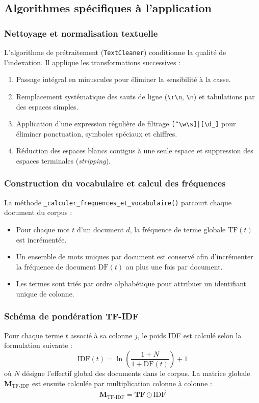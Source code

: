 \documentclass[12pt,a4paper]{article}
\begin{document}
\newpage

\subsection{Algorithmes spécifiques à l'application}

\subsubsection{Nettoyage et normalisation textuelle}
L'algorithme de prétraitement (\texttt{TextCleaner}) conditionne la qualité de l'indexation. Il applique les transformations successives :
\begin{enumerate}
    \item Passage intégral en minuscules pour éliminer la sensibilité à la casse.
    \item Remplacement systématique des sauts de ligne (\texttt{\textbackslash r\textbackslash n}, \texttt{\textbackslash n}) et tabulations par des espaces simples.
    \item Application d'une expression régulière de filtrage \texttt{[\^{}\textbackslash{}w\textbackslash{}s]|[\textbackslash{}d\_]} pour éliminer ponctuation, symboles spéciaux et chiffres.
    \item Réduction des espaces blancs contigus à une seule espace et suppression des espaces terminales (\textit{stripping}).
\end{enumerate}

\subsubsection{Construction du vocabulaire et calcul des fréquences}
La méthode \texttt{\_calculer\_frequences\_et\_vocabulaire()} parcourt chaque document du corpus :
\begin{itemize}
    \item Pour chaque mot $t$ d'un document $d$, la fréquence de terme globale $\text{TF}(t)$ est incrémentée.
    \item Un ensemble de mots uniques par document est conservé afin d'incrémenter la fréquence de document $\text{DF}(t)$ au plus une fois par document.
    \item Les termes sont triés par ordre alphabétique pour attribuer un identifiant unique de colonne.
\end{itemize}

\subsubsection{Schéma de pondération TF-IDF}
Pour chaque terme $t$ associé à sa colonne $j$, le poids IDF est calculé selon la formulation suivante :
\begin{equation}
    \text{IDF}(t) = \ln\left(\frac{1 + N}{1 + \text{DF}(t)}\right) + 1
\end{equation}
où $N$ désigne l'effectif global des documents dans le corpus. La matrice globale  $\mathbf{M}_{\text{TF-IDF}}$ est ensuite calculée par multiplication colonne à colonne :
\begin{equation}
    \mathbf{M}_{\text{TF-IDF}} = \mathbf{TF} \odot \vec{\text{IDF}}
\end{equation}
\end{document}
